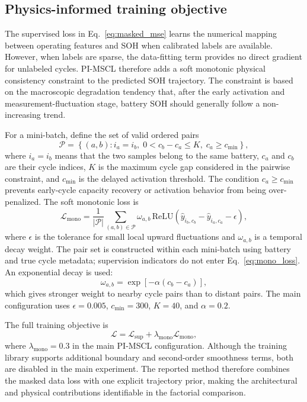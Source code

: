 \documentclass[a4paper,fleqn]{cas-dc}
\begin{document}
\subsection{Physics-informed training objective}
\label{subsec:objective}

The supervised loss in Eq.~\eqref{eq:masked_mse} learns the numerical mapping between operating features and SOH when calibrated labels are available. However, when labels are sparse, the data-fitting term provides no direct gradient for unlabeled cycles. PI-MSCL therefore adds a soft monotonic physical consistency constraint to the predicted SOH trajectory. The constraint is based on the macroscopic degradation tendency that, after the early activation and measurement-fluctuation stage, battery SOH should generally follow a non-increasing trend.

For a mini-batch, define the set of valid ordered pairs
\begin{equation}
\mathcal{P}=\left\{(a,b): i_a=i_b,\;0<c_b-c_a\leq K,\;c_a\geq c_{\min}\right\},
\label{eq:pair_set}
\end{equation}
where $i_a=i_b$ means that the two samples belong to the same battery, $c_a$ and $c_b$ are their cycle indices, $K$ is the maximum cycle gap considered in the pairwise constraint, and $c_{\min}$ is the delayed activation threshold. The condition $c_a\geq c_{\min}$ prevents early-cycle capacity recovery or activation behavior from being over-penalized. The soft monotonic loss is
\begin{equation}
\mathcal{L}_{\mathrm{mono}}=
\frac{1}{|\mathcal{P}|}
\sum_{(a,b)\in\mathcal{P}}
\omega_{a,b}\,
\mathrm{ReLU}\left(\hat{y}_{i_b,c_b}-\hat{y}_{i_a,c_a}-\epsilon\right),
\label{eq:mono_loss}
\end{equation}
where $\epsilon$ is the tolerance for small local upward fluctuations and $\omega_{a,b}$ is a temporal decay weight. The pair set is constructed within each mini-batch using battery and true cycle metadata; supervision indicators do not enter Eq.~\eqref{eq:mono_loss}. An exponential decay is used:
\begin{equation}
\omega_{a,b}=\exp\left[-\alpha\left(c_b-c_a\right)\right],
\label{eq:temporal_decay}
\end{equation}
which gives stronger weight to nearby cycle pairs than to distant pairs. The main configuration uses $\epsilon=0.005$, $c_{\min}=300$, $K=40$, and $\alpha=0.2$.

The full training objective is
\begin{equation}
\mathcal{L}=\mathcal{L}_{\mathrm{sup}}
+\lambda_{\mathrm{mono}}\mathcal{L}_{\mathrm{mono}},
\label{eq:total_loss}
\end{equation}
where $\lambda_{\mathrm{mono}}=0.3$ in the main PI-MSCL configuration. Although the training library supports additional boundary and second-order smoothness terms, both are disabled in the main experiment. The reported method therefore combines the masked data loss with one explicit trajectory prior, making the architectural and physical contributions identifiable in the factorial comparison.
\end{document}
